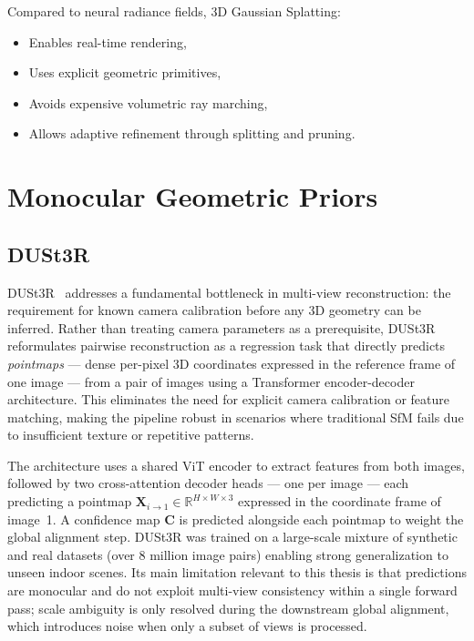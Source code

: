 Compared to neural radiance fields, 3D Gaussian Splatting:
\begin{itemize}
    \item Enables real-time rendering,
    \item Uses explicit geometric primitives,
    \item Avoids expensive volumetric ray marching,
    \item Allows adaptive refinement through splitting and pruning.
\end{itemize}

\section{Monocular Geometric Priors}

\subsection{DUSt3R}
\label{sec:dust3r}

DUSt3R~\cite{dust3r} addresses a fundamental bottleneck in multi-view reconstruction: the requirement for known camera calibration before any 3D geometry can be inferred. Rather than treating camera parameters as a prerequisite, DUSt3R reformulates pairwise reconstruction as a regression task that directly predicts \emph{pointmaps} — dense per-pixel 3D coordinates expressed in the reference frame of one image — from a pair of images using a Transformer encoder-decoder architecture. This eliminates the need for explicit camera calibration or feature matching, making the pipeline robust in scenarios where traditional SfM fails due to insufficient texture or repetitive patterns.

The architecture uses a shared ViT encoder to extract features from both images, followed by two cross-attention decoder heads — one per image — each predicting a pointmap $\mathbf{X}_{i \to 1} \in \mathbb{R}^{H \times W \times 3}$ expressed in the coordinate frame of image~1. A confidence map $\mathbf{C}$ is predicted alongside each pointmap to weight the global alignment step. DUSt3R was trained on a large-scale mixture of synthetic and real datasets (over 8 million image pairs) enabling strong generalization to unseen indoor scenes. Its main limitation relevant to this thesis is that predictions are monocular and do not exploit multi-view consistency within a single forward pass; scale ambiguity is only resolved during the downstream global alignment, which introduces noise when only a subset of views is processed.

